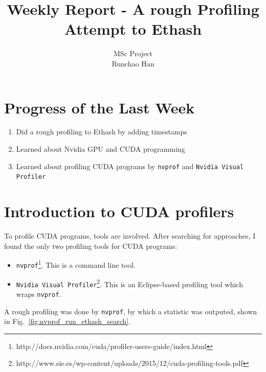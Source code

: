 \documentclass[11pt]{article}
\begin{document}
\title{Weekly Report - A rough Profiling Attempt to Ethash}
\author{MSc Project \\
Runchao Han \\
}
\maketitle
%
%

\section{Progress of the Last Week}

\begin{enumerate}
\item Did a rough profiling to Ethash by adding timestamps
\item Learned about Nvidia GPU and CUDA programming
\item Learned about profiling CUDA programs by \texttt{nvprof} and \texttt{Nvidia Visual Profiler}
\end{enumerate}

\section{Introduction to CUDA profilers}

To profile CUDA programs, tools are involved. After searching for approaches, I found the only two profiling tools for CUDA programs:

\begin{itemize}
\item \texttt{nvprof}\footnote{http://docs.nvidia.com/cuda/profiler-users-guide/index.html}. This is a command line tool.
\item \texttt{Nvidia Visual Profiler}\footnote{http://www.sie.es/wp-content/uploads/2015/12/cuda-profiling-tools.pdf}. This is an Eclipse-based profiling tool which wraps \texttt{nvprof}.
\end{itemize}

A rough profiling was done by \texttt{nvprof}, by which a statistic was outputed, shown in Fig.~\ref{fig:nvprof_run_ethash_search}.
\end{document}
